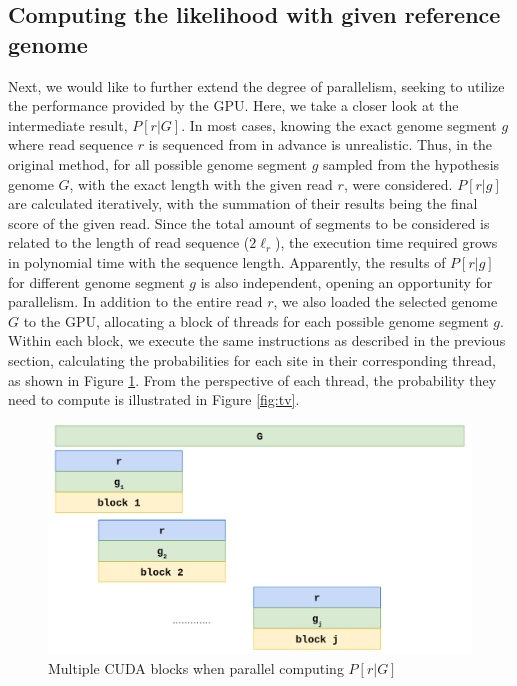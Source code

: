 \documentclass{PHlab-thesis}
\begin{document}
\subsection{Computing the likelihood with given reference genome}
Next, we would like to further extend the degree of parallelism, seeking to utilize the performance provided by the GPU. Here, we take a closer look at the intermediate result, $P[r|G]$. In most cases, knowing the exact genome segment $g$ where read sequence $r$ is sequenced from in advance is unrealistic. Thus, in the original method, for all possible genome segment $g$ sampled from the hypothesis genome $G$, with the exact length with the given read $r$, were considered. $P[r|g]$ are calculated iteratively, with the summation of their results being the final score of the given read. Since the total amount of segments to be considered is related to the length of read sequence ($2{\ell_r}$), the execution time required grows in polynomial time with the sequence length. Apparently, the results of $P[r|g]$ for different genome segment $g$ is also independent, opening an opportunity for parallelism. In addition to the entire read $r$, we also loaded the selected genome $G$ to the GPU, allocating a block of threads for each possible genome segment $g$. Within each block, we execute the same instructions as described in the previous section, calculating the probabilities for each site in their corresponding thread, as shown in Figure \ref{fig:prG}. From the perspective of each thread, the probability they need to compute is illustrated in Figure \ref{fig:tv}.
\begin{figure}
	\centering
	\includegraphics[scale=0.3]{figures/prG.png}
	\caption{Multiple CUDA blocks when parallel computing $P[r|G]$}
	\label{fig:prG} %
\end{figure}
\end{document}
